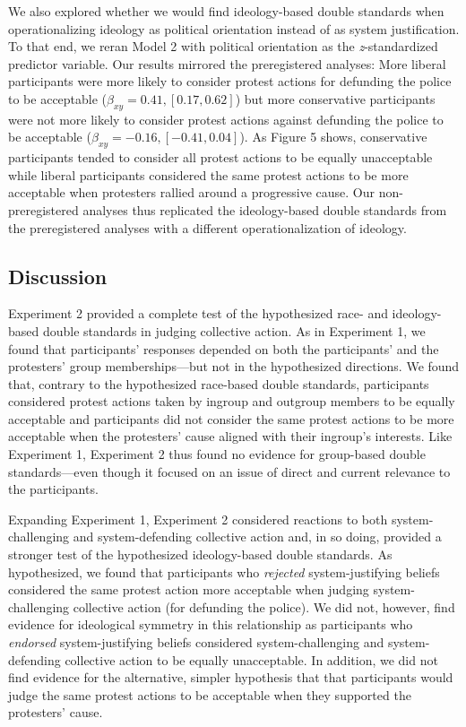 \documentclass[12pt, letterpaper]{article}
\begin{document}
We also explored whether we would find ideology-based double standards
when operationalizing ideology as political orientation instead of as
system justification. To that end, we reran Model 2 with political
orientation as the \emph{z}-standardized predictor variable. Our results
mirrored the preregistered analyses: More liberal participants were more
likely to consider protest actions for defunding the police to be
acceptable (\(\beta_{xy} = 0.41, [0.17, 0.62]\)) but more conservative
participants were not more likely to consider protest actions against
defunding the police to be acceptable
(\(\beta_{xy} = -0.16, [-0.41, 0.04]\)). As Figure 5 shows, conservative
participants tended to consider all protest actions to be equally
unacceptable while liberal participants considered the same protest
actions to be more acceptable when protesters rallied around a
progressive cause. Our non-preregistered analyses thus replicated the
ideology-based double standards from the preregistered analyses with a
different operationalization of ideology.

\hypertarget{discussion-1}{%
\subsection{Discussion}\label{discussion-1}}

Experiment 2 provided a complete test of the hypothesized race- and
ideology-based double standards in judging collective action. As in
Experiment 1, we found that participants' responses depended on both the
participants' and the protesters' group memberships---but not in the
hypothesized directions. We found that, contrary to the hypothesized
race-based double standards, participants considered protest actions
taken by ingroup and outgroup members to be equally acceptable and
participants did not consider the same protest actions to be more
acceptable when the protesters' cause aligned with their ingroup's
interests. Like Experiment 1, Experiment 2 thus found no evidence for
group-based double standards---even though it focused on an issue of
direct and current relevance to the participants.

Expanding Experiment 1, Experiment 2 considered reactions to both
system-challenging and system-defending collective action and, in so
doing, provided a stronger test of the hypothesized ideology-based
double standards. As hypothesized, we found that participants who
\emph{rejected} system-justifying beliefs considered the same protest
action more acceptable when judging system-challenging collective action
(for defunding the police). We did not, however, find evidence for
ideological symmetry in this relationship as participants who
\emph{endorsed} system-justifying beliefs considered system-challenging
and system-defending collective action to be equally unacceptable. In
addition, we did not find evidence for the alternative, simpler
hypothesis that that participants would judge the same protest actions
to be acceptable when they supported the protesters' cause.
\end{document}
